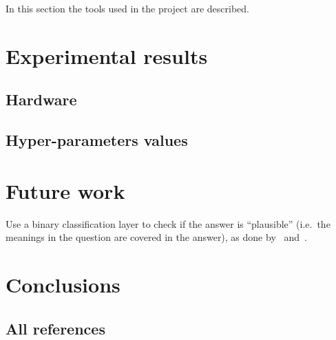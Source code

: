 \documentclass[11pt,hidelinks]{article}
\begin{document}

In this section the tools used in the project are described.

\section{Experimental results}\label{sec:experimental_results}


\subsection{Hardware}


\subsection{Hyper-parameters values}

\section{Future work}\label{sec:future_work}
Use a binary classification layer to check if the answer is ``plausible'' (i.e.~the meanings in the question are covered in the answer), as done by~\cite{Hu2019ReadV} and~\cite{Back2020NeurQuRI}.



\section{Conclusions}\label{sec:conclusions}

\subsection{All references}
\end{document}
